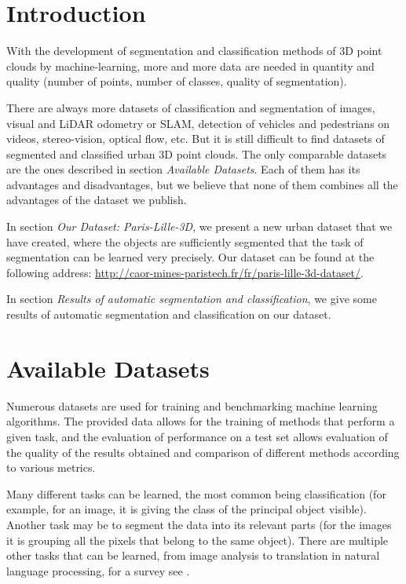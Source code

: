 \documentclass[a4paper, 10pt, journal]{article}
\begin{document}
\section{Introduction}

With the development of segmentation and classification methods of 3D point clouds by machine-learning, more and more data are needed in quantity and quality (number of points, number of classes, quality of segmentation).

There are always more datasets of classification and segmentation of images, visual and LiDAR odometry or SLAM, detection of vehicles and pedestrians on videos, stereo-vision, optical flow, etc. But it is still difficult to find datasets of segmented and classified urban 3D point clouds. The only comparable datasets are the ones described in section \textit{Available Datasets}. Each of them has its advantages and disadvantages, but we believe that none of them combines all the advantages of the dataset we publish.

In section \textit{Our Dataset: Paris-Lille-3D}, we present a new urban dataset that we have created, where the objects are sufficiently segmented that the task of segmentation can be learned very precisely.
Our dataset can be found at the following address: \href{http://caor-mines-paristech.fr/fr/paris-lille-3d-dataset/}{http://caor-mines-paristech.fr/fr/paris-lille-3d-dataset/}. 

In section \textit{Results of automatic segmentation and classification}, we give some results of automatic segmentation and classification on our dataset.

\section{Available Datasets}
\label{sec:otherDatasets}

Numerous datasets are used for training and benchmarking machine learning algorithms. The provided data allows for the training of methods that perform a given task, and the evaluation of performance on a test set allows evaluation of the quality of the results obtained and comparison of different methods according to various metrics.

Many different tasks can be learned, the most common being classification (for example, for an image, it is giving the class of the principal object visible). Another task may be to segment the data into its relevant parts (for the images it is grouping all the pixels that belong to the same object). There are multiple other tasks that can be learned, from image analysis to translation in natural language processing, for a survey see \cite{ferraro2015survey}.
\end{document}
